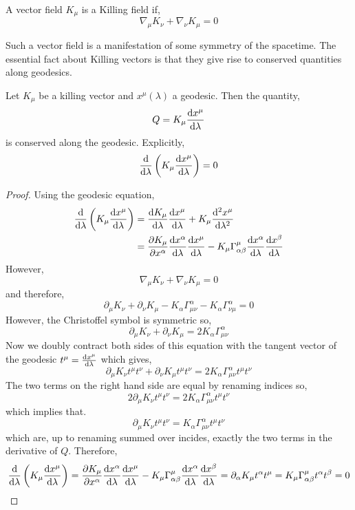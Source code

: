 \documentclass[11pt, a4paper]{article}
\begin{document}
\begin{definition}
A vector field $K_\mu$ is a Killing field if,
\[ \nabla_{\mu} K_\nu + \nabla_{\nu} K_{\mu} = 0 \]
\end{definition}
Such a vector field is a manifestation of some symmetry of the spacetime. The essential fact about Killing vectors is that they give rise to conserved quantities along geodesics.

\begin{theorem}
Let $K_\mu$ be a killing vector and $x^{\mu}(\lambda)$ a geodesic. Then the quantity,
\[ Q = K_\mu \frac{\mathrm{d}x^{\mu}}{\mathrm{d}\lambda}\]
is conserved along the geodesic. Explicitly,
\[ \frac{\mathrm{d}}{\mathrm{d}\lambda} \left( K_\mu \frac{\mathrm{d}x^{\mu}}{\mathrm{d}\lambda} \right) = 0\]
\end{theorem}

\begin{proof}
Using the geodesic equation,
\begin{align*}
\frac{\mathrm{d}}{\mathrm{d}\lambda} \left( K_\mu \frac{\mathrm{d}x^{\mu}}{\mathrm{d}\lambda} \right) & = \frac{\mathrm{d}K_\mu}{\mathrm{d}\lambda} \frac{\mathrm{d}x^{\mu}}{\mathrm{d}\lambda} + K_\mu \frac{\mathrm{d}^{2} x^{\mu}}{\mathrm{d}\lambda^{2}} 
\\
& = \frac{\partial{K_\mu}}{\partial{x^{\alpha}}} \frac{\mathrm{d}x^{\alpha}}{\mathrm{d}\lambda} \frac{\mathrm{d}x^{\mu}}{\mathrm{d}\lambda} - K_\mu \Gamma^{\mu}_{\alpha \beta} \frac{\mathrm{d}x^\alpha}{\mathrm{d}\lambda} \frac{\mathrm{d}x^\beta}{\mathrm{d}\lambda}
\end{align*}
However,
\[ \nabla_{\mu} K_\nu + \nabla_{\nu} K_{\mu} = 0 \]
and therefore,
\[ \partial_{\mu} K_\nu + \partial_{\nu} K_{\mu} - K_{\alpha} \Gamma^{\alpha}_{\mu \nu} - K_{\alpha} \Gamma^{\alpha}_{\nu \mu} = 0 \]
However, the Christoffel symbol is symmetric so,
\[ \partial_{\mu} K_\nu + \partial_{\nu} K_{\mu} = 2 K_{\alpha} \Gamma^{\alpha}_{\mu \nu} \]
Now we doubly contract both sides of this equation with the tangent vector of the geodesic $t^\mu = \frac{\mathrm{d}x^\mu}{\mathrm{d}\lambda}$ which gives,
\[ \partial_\mu K_\nu t^\mu t^\nu + \partial_{\nu} K_{\mu} t^\mu t^\nu = 2 K_{\alpha} \Gamma^{\alpha}_{\mu \nu} t^{\mu} t^{\nu} \]
The two terms on the right hand side are equal by renaming indices so,
\[ 2 \partial_\mu K_\nu t^\mu t^\nu = 2 K_{\alpha} \Gamma^{\alpha}_{\mu \nu} t^{\mu} t^{\nu} \]
which implies that.
\[ \partial_{\mu} K_{\nu} t^\mu t^\nu = K_{\alpha} \Gamma^{\alpha}_{\mu \nu} t^\mu t^\nu \]
which are, up to renaming summed over incides, exactly the two terms in the derivative of $Q$. Therefore,
\[ \frac{\mathrm{d}}{\mathrm{d}\lambda} \left( K_\mu \frac{\mathrm{d}x^{\mu}}{\mathrm{d}\lambda} \right) = \frac{\partial{K_\mu}}{\partial{x^{\alpha}}} \frac{\mathrm{d}x^{\alpha}}{\mathrm{d}\lambda} \frac{\mathrm{d}x^{\mu}}{\mathrm{d}\lambda} - K_\mu \Gamma^{\mu}_{\alpha \beta} \frac{\mathrm{d}x^\alpha}{\mathrm{d}\lambda} \frac{\mathrm{d}x^\beta}{\mathrm{d}\lambda} = \partial_{\alpha} K_{\mu} t^\alpha t^\mu = K_{\mu} \Gamma^{\mu}_{\alpha \beta} t^\alpha t^\beta = 0\]
\end{proof}
\end{document}

